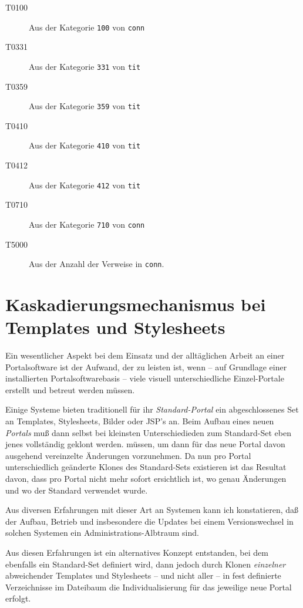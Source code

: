 \documentclass[11pt, twoside, a4paper, BCOR8mm, DIV12, bibtotoc,idxtotoc]{scrbook}
\begin{document}
\begin{description}
\item[T0100] Aus der Kategorie \texttt{100} von \texttt{conn}
\item[T0331] Aus der Kategorie \texttt{331} von \texttt{tit}
\item[T0359] Aus der Kategorie \texttt{359} von \texttt{tit}
\item[T0410] Aus der Kategorie \texttt{410} von \texttt{tit}
\item[T0412] Aus der Kategorie \texttt{412} von \texttt{tit}
\item[T0710] Aus der Kategorie \texttt{710} von \texttt{conn}
\item[T5000] Aus der Anzahl der Verweise in \texttt{conn}.
\end{description}


\section{Kaskadierungsmechanismus bei Templates und Stylesheets}

Ein wesentlicher Aspekt bei dem Einsatz und der alltäglichen Arbeit an
einer Portalsoftware ist der Aufwand, der zu leisten ist, wenn -- auf
Grundlage einer installierten Portalsoftwarebasis -- viele visuell
unterschiedliche Einzel-Portale erstellt und betreut werden müssen.

Einige Systeme bieten traditionell für ihr \emph{Standard-Portal} ein
abgeschlossenes Set an Templates, Stylesheets, Bilder oder JSP's an.
Beim Aufbau eines neuen \emph{Portals} muß dann selbst bei kleinsten
Unterschiedieden zum Standard-Set eben jenes vollständig geklont
werden. müssen, um dann für das neue Portal davon ausgehend
vereinzelte Änderungen vorzunehmen. Da nun pro Portal unterschiedlich
geänderte Klones des Standard-Sets existieren ist das Resultat davon,
dass pro Portal nicht mehr sofort ersichtlich ist, wo genau Änderungen
und wo der Standard verwendet wurde.

Aus diversen Erfahrungen mit dieser Art an Systemen kann ich
konstatieren, daß der Aufbau, Betrieb und insbesondere die Updates bei
einem Versionswechsel in solchen Systemen ein Adminis\-tra\-tions-Albtraum
sind.

Aus diesen Erfahrungen ist ein alternatives Konzept entstanden, bei
dem ebenfalls ein Standard-Set definiert wird, dann jedoch durch Klonen
\emph{einzelner} abweichender Templates und Stylesheets -- und nicht
aller -- in fest definierte Verzeichnisse im Dateibaum die
Individualisierung für das jeweilige neue Portal erfolgt.
\end{document}
